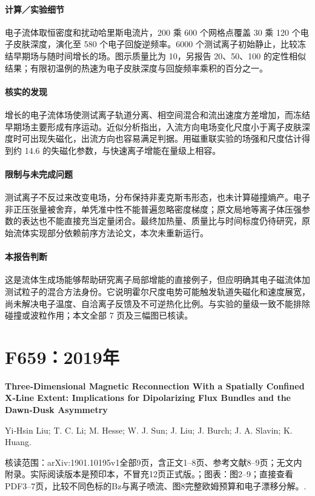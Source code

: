 \paragraph{计算／实验细节}电子流体取恒密度和扰动哈里斯电流片，200 乘 600 个网格点覆盖 30 乘 120 个电子皮肤深度，演化至 580 个电子回旋逆频率。6000 个测试离子初始静止，比较冻结早期场与随时间增长的场。图示质量比为 10，另报告 20、50、100 的定性相似结果；有限初温例的热速为电子皮肤深度与回旋频率乘积的百分之一。

\paragraph{核实的发现}增长的电子流体场使测试离子轨道分离、相空间混合和流出速度方差增加，而冻结早期场主要形成有序运动。近似分析指出，入流方向电场变化尺度小于离子皮肤深度时可出现失磁化，出流方向也容易满足判据。用磁重联实验的场强和尺度估计得到约 14.6 的失磁化参数，与快速离子增能在量级上相容。

\paragraph{限制与未完成问题}测试离子不反过来改变电场，分布保持非麦克斯韦形态，也未计算碰撞熵产。电子非正压张量被舍弃，单凭准中性不能普遍忽略密度梯度；原文局地等离子体压强参数的表达也不能直接充当定量闭合。最终加热量、质量比与时间标度仍待研究，原始流体实现部分依赖前序方法论文，本次未重新运行。

\paragraph{本报告判断}这是流体生成场能够帮助研究离子局部增能的直接例子，但应明确其电子磁流体加测试粒子的混合方法身份。它说明霍尔尺度电势可能触发轨道失磁化和速度展宽，尚未解决电子温度、自洽离子反馈及不可逆热化比例。与实验的量级一致不能排除碰撞或波粒作用；本文全部 7 页及三幅图已核读。

\section{F659：2019年}\label{paper:F659}

\textbf{Three‐Dimensional Magnetic Reconnection With a Spatially Confined X‐Line Extent: Implications for Dipolarizing Flux Bundles and the Dawn‐Dusk Asymmetry}\citep{F659}\

Yi‐Hsin Liu;  T. C. Li;  M. Hesse;  W. J. Sun;  J. Liu;  J. Burch;  J. A. Slavin;  K. Huang.

\textsf{核读范围：}arXiv:1901.10195v1全部9页，含正文1–8页、参考文献8–9页；无文内附录。实际阅读版本是预印本，不冒充12页正式版。；\textsf{图表：}图2–9；直接查看PDF3–7页，比较不同色标的Bz与离子喷流、图8完整欧姆预算和电子漂移分解。.

